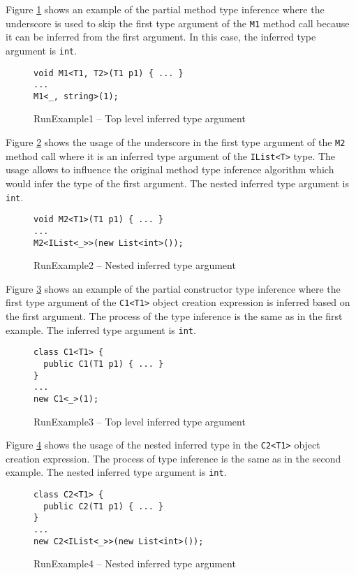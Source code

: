 Figure \ref{img100:example1} shows an example of the partial method type inference where the underscore is used to skip the first type argument of the \texttt{M1} method call because it can be inferred from the first argument.
In this case, the inferred type argument is \texttt{int}.
\begin{figure}[!h]
\begin{lstlisting}[style=csharp, showstringspaces=false]
void M1<T1, T2>(T1 p1) { ... }
...
M1<_, string>(1);
\end{lstlisting}
\caption{RunExample1 -- Top level inferred type argument}
\label{img100:example1}
\end{figure}
\par
Figure \ref{img101:example2} shows the usage of the underscore in the first type argument of the \texttt{M2} method call where it is an inferred type argument of the \texttt{IList<T>} type.
The usage allows to influence the original method type inference algorithm which would infer the type of the first argument.
The nested inferred type argument is \texttt{int}.
\begin{figure}[!h]
\begin{lstlisting}[style=csharp, showstringspaces=false]
void M2<T1>(T1 p1) { ... }
...
M2<IList<_>>(new List<int>());
\end{lstlisting}
\caption{RunExample2 -- Nested inferred type argument}
\label{img101:example2}
\end{figure}
\par
Figure \ref{img102:example3} shows an example of the partial constructor type inference where the first type argument of the \texttt{C1<T1>} object creation expression is inferred based on the first argument.
The process of the type inference is the same as in the first example.
The inferred type argument is \texttt{int}.
\begin{figure}[!h]
\begin{lstlisting}[style=csharp, showstringspaces=false]
class C1<T1> {
  public C1(T1 p1) { ... }
}
...
new C1<_>(1);
\end{lstlisting}
\caption{RunExample3 -- Top level inferred type argument}
\label{img102:example3}
\end{figure}
\par
Figure \ref{img103:example4} shows the usage of the nested inferred type in the \texttt{C2<T1>} object creation expression.
The process of type inference is the same as in the second example.
The nested inferred type argument is \texttt{int}.
\begin{figure}[!h]
\begin{lstlisting}[style=csharp, showstringspaces=false]
class C2<T1> {
  public C2(T1 p1) { ... }
}
...
new C2<IList<_>>(new List<int>());
\end{lstlisting}
\caption{RunExample4 -- Nested inferred type argument}
\label{img103:example4}
\end{figure}
